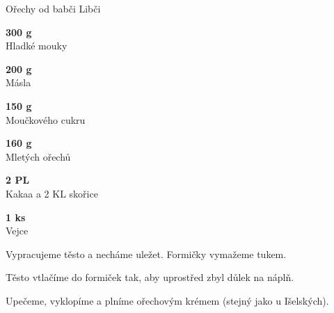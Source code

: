 \documentclass[11pt,a4paper]{article}
\begin{document}
\begin{recipe}[Sienna]{Ořechy od babči Libči}
    \begin{ingredients}
        \item \parbox[t]{\linewidth}{\raggedright \weight \textbf{300 g}\\ Hladké mouky}
        \item \parbox[t]{\linewidth}{\raggedright \weight \textbf{200 g}\\ Másla}
        \item \parbox[t]{\linewidth}{\raggedright \weight \textbf{150 g}\\ Moučkového cukru}
        \item \parbox[t]{\linewidth}{\raggedright \weight \textbf{160 g}\\ Mletých ořechů}
        \item \parbox[t]{\linewidth}{\raggedright \spoon \textbf{2 PL}\\ Kakaa a 2 KL skořice}
        \item \parbox[t]{\linewidth}{\raggedright \piece \textbf{1 ks}\\ Vejce}
    \end{ingredients}
    \begin{steps}
        \item Vypracujeme těsto a necháme uležet. Formičky vymažeme tukem.
        \item Těsto vtlačíme do formiček tak, aby uprostřed zbyl důlek na náplň.
        \item Upečeme, vyklopíme a plníme ořechovým krémem (stejný jako u Išelských).
    \end{steps}
\end{recipe}
\end{document}
